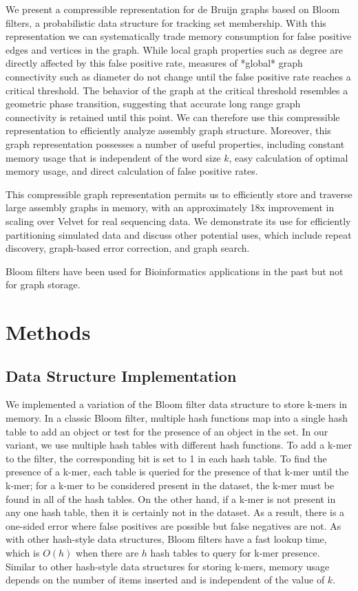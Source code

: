 \documentclass[12pt]{article} \usepackage{simplemargins}
\begin{document}
We present a compressible representation for de Bruijn graphs based on
Bloom filters\cite{bloom}, a probabilistic data structure for tracking set
membership.  With this representation we can systematically trade
memory consumption for false positive edges and vertices in the graph.
While local graph properties such as degree are directly affected by
this false positive rate, measures of *global* graph connectivity such
as diameter do not change until the false positive rate reaches a
critical threshold.  The behavior of the graph at the critical
threshold resembles a geometric phase transition, suggesting that
accurate long range graph connectivity is retained until this point.
We can therefore use this compressible representation to efficiently
analyze assembly graph structure.  Moreover, this graph representation
possesses a number of useful properties, including constant memory
usage that is independent of the word size $k$, easy calculation of
optimal memory usage, and direct calculation of false positive rates.

This compressible graph representation permits us to efficiently store
and traverse large assembly graphs in memory, with an approximately
18x improvement in scaling over Velvet for real sequencing data.  We
demonstrate its use for efficiently partitioning simulated data and
discuss other potential uses, which include repeat discovery,
graph-based error correction, and graph search.

Bloom filters have been used for 
Bioinformatics applications 
in the past\cite{pmid20472541, haskell, pmid20426693} but not for graph 
storage.

\section{Methods}

\subsection{Data Structure Implementation}
We implemented a variation of the Bloom filter data structure to store k-mers
in memory. In a classic Bloom filter, multiple hash functions map into 
a single hash table to add an object or test for the presence of an object 
in the set. In 
our variant, we use multiple hash tables with different hash functions. 
To add a k-mer to the filter, the corresponding bit is set to 1 
in each hash table.  
To find the presence of a k-mer, each table is queried for the
presence of that k-mer until the k-mer; for a k-mer to be considered 
present in the dataset, 
the k-mer must be found in all of the hash tables. On the other hand, 
if a k-mer is not present in any one hash table, then it is certainly 
not in the dataset. As a result, there is a one-sided error where 
false positives are possible but false negatives are not. As with other 
hash-style data structures, Bloom filters have a
fast lookup time, which is $O(h)$ when there are $h$ hash tables to query
for k-mer presence. Similar to other hash-style data structures for 
storing k-mers, memory usage depends on the number of items inserted 
and is independent of the value of $k$. 
\end{document}
